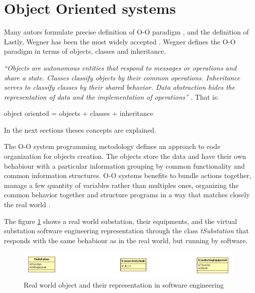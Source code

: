 \section{Object Oriented systems}



Many autors formulate precise 
definition of \gls{O-O} paradigm 
\cite{Rentsch:1982} 
\cite{Pascoe:1986}
\cite{Nygaard:1986}
\cite{Madsen:1988}, 
and the definition of Lastly, Wegner 
\cite{Wegner:1987} has been 
the most widely 
accepted \cite{Capretz:2003}. Wegner defines 
the \gls{O-O} paradigm in terms of objects, 
classes and inheritance.

\emph{
	``Objects are autonomous entities 
	that respond to messages or operations and share 
	a state. Classes classify objects by their common 
	operations. Inheritance serves to classify classes by 
	their shared behavior. Data abstraction hides the 
	representation of data and the implementation of 
	operations'' 
}\cite{Wegner:1987}. That is: 

\begin{center}
	object oriented = objects + classes + inheritance
\end{center}
In the next sections theses concepts are explained.

The O-O system programming metodology 
defines an approach to code organization 
for objects creation. 
The objects store the data and 
have their own behabiour with a 
particular information grouping 
by common functionality and common 
information structures. 
O-O systems benefits 
to bundle actions together, 
manage a few quantity of variables rather 
than multiples ones, 
organizing the 
common behavior together and 
structure programs in a way that
matches closely 
the real world \cite{Adobe:AS3man2008}. 

The figure \ref{fig:real-world-objets-represented} shows  
a real world substation, their equipments, 
and the virtual substation  
software engineering representation 
through the class \emph{tSubstation} that 
responds with the same behabiour as in 
the real world, 
but running by software.


\begin{figure}
  \includegraphics[width=1.0\textwidth]{chapters/ch-oop/figures/real-word-objets-represented}
  \caption{Real world object and their representation in software engineering}
  \label{fig:real-world-objets-represented}
\end{figure}

